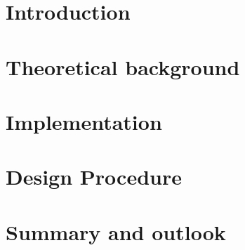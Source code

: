 \single{\documentclass[12pt,a4paper,oneside,german,english]{book}}
\begin{document}
%

\newpage
\tableofcontents


\mainmatter





\chapter{Introduction}
\label{chap:intro}


\chapter{Theoretical background}
\label{chap:theory}


\chapter{Implementation}
\label{chap:implementation}


\chapter{Design Procedure}
\label{chap:design}


\chapter{Summary and outlook}
\label{chap:summary}

\end{document}
